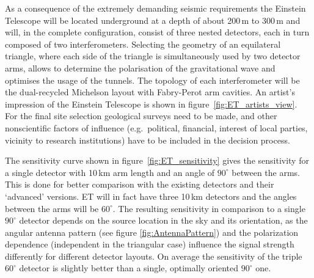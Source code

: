 As a consequence of the extremely demanding seismic requirements the Einstein Telescope will be located underground at a depth of about 200\,m to 300\,m and will, in the complete configuration, consist of three nested detectors, each in turn composed of two interferometers. Selecting the geometry of an equilateral triangle,  where each side of the triangle is simultaneously used by two detector arms, allows to determine the polarisation of the gravitational wave  and optimises the usage of the tunnels. The topology of each interferometer will be the dual-recycled Michelson layout with Fabry-Perot arm cavities. An artist's impression of the Einstein Telescope is shown in figure~\ref{fig:ET_artists_view}. \\
For the final site selection geological surveys need to be made, and other nonscientific factors of influence (e.g.\ political, financial, interest of local parties, vicinity to research institutions) have to be included in the decision process.

The sensitivity curve shown in figure~\ref{fig:ET_sensitivity} gives the sensitivity for a single detector with 10\,km arm length and an angle of $90^{\circ}$ between the arms. This is done for better comparison with the existing detectors and their `advanced' versions. ET will in fact have three 10\,km detectors and the angles between the arms will be $60^{\circ}$. The resulting sensitivity in comparison to a single $90^{\circ}$ detector depends on the source location in the sky and its orientation, as the angular antenna pattern (see figure \ref{fig:AntennaPattern}) and the polarization dependence (independent in the triangular case) influence the signal strength differently for different detector layouts. On average the sensitivity of the triple $60^{\circ}$ detector is slightly better than a single, optimally oriented $90^{\circ}$ one.

